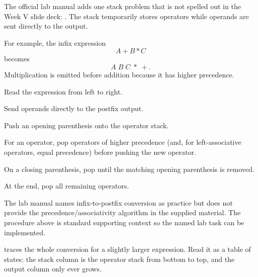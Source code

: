 The official lab manual adds one stack problem that is not spelled out in the Week V slide deck: . The stack temporarily stores operators while operands are sent directly to the output.

For example, the infix expression
\[
A + B * C
\]
becomes
\[
A\;B\;C\;*\;+.
\]
Multiplication is emitted before addition because it has higher precedence.

\begin{utpsteps}
  \item Read the expression from left to right.
  \item Send operands directly to the postfix output.
  \item Push an opening parenthesis onto the operator stack.
  \item For an operator, pop operators of higher precedence (and, for left-associative operators, equal precedence) before pushing the new operator.
  \item On a closing parenthesis, pop until the matching opening parenthesis is removed.
  \item At the end, pop all remaining operators.
\end{utpsteps}

\begin{clarification}
The lab manual names infix-to-postfix conversion as practice but does not provide the precedence/associativity algorithm in the supplied material. The procedure above is standard supporting context so the named lab task can be implemented.
\end{clarification}

 traces the whole conversion for a slightly larger expression. Read
it as a table of states: the stack column is the operator stack from bottom to top, and the
output column only ever grows.

